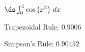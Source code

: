 {$\ds \int_{0}^{1} \cos \big(x^2\big) \ dx$}
{Trapezoidal Rule: 	$0.9006$

Simpson's Rule: $0.90452$
}